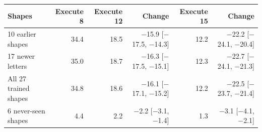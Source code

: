 
\begin{tabular}{lrrrrr}
\toprule
Shapes & Execute 8 & Execute 12 & Change & Execute 15 & Change \\
\midrule
10 earlier shapes & 34.4 & 18.5 & $-$15.9 [$-$17.5, $-$14.3] & 12.2 & $-$22.2 [$-$24.1, $-$20.4] \\
17 newer letters & 35.0 & 18.7 & $-$16.3 [$-$17.5, $-$15.1] & 12.3 & $-$22.7 [$-$24.1, $-$21.3] \\
All 27 trained shapes & 34.8 & 18.6 & $-$16.1 [$-$17.1, $-$15.2] & 12.2 & $-$22.5 [$-$23.7, $-$21.4] \\
6 never-seen shapes & 4.4 & 2.2 & $-$2.2 [$-$3.1, $-$1.4] & 1.3 & $-$3.1 [$-$4.1, $-$2.1] \\
\bottomrule
\end{tabular}
